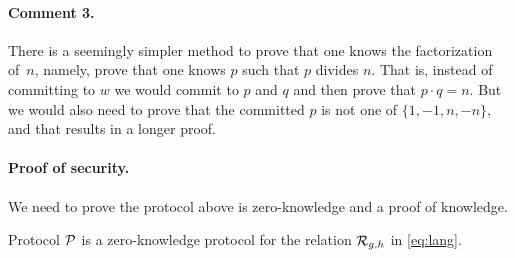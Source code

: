\documentclass[11pt]{article}
\begin{document}
\paragraph{Comment 3.}
There is a seemingly simpler method to prove that one knows the
factorization of~$n$, namely, prove that one knows $p$ such that $p$
divides $n$.  That is, instead of committing to $w$ we would commit to
$p$ and $q$ and then prove that $p \cdot q = n$. But we would
also need to prove that the committed $p$ is not one of 
$\{1, -1, n, -n\}$, and that results in a longer proof.

\paragraph{Proof of security.}
We need to prove the protocol above is zero-knowledge and a 
proof of knowledge. 

\begin{theorem}
Protocol $\mathcal{{P}}$ is a zero-knowledge protocol
for the relation ${\cal R}_{g,h}$ in \eqref{eq:lang}.
\end{theorem}
\end{document}
